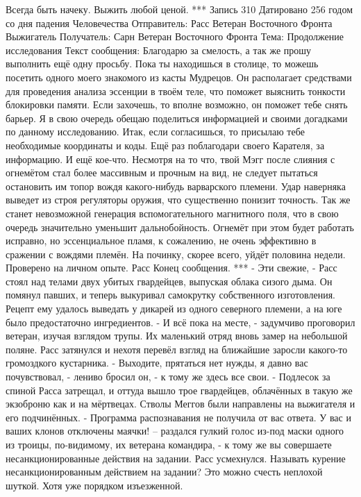 \documentclass[a4paper, 12pt]{report}
\begin{document}
Всегда быть начеку. Выжить любой ценой.
***
Запись 310
Датировано 256 годом со дня падения Человечества
Отправитель: Расс Ветеран Восточного Фронта Выжигатель
Получатель: Сарн Ветеран Восточного Фронта
Тема: Продолжение исследования
Текст сообщения:	
	Благодарю за смелость, а так же прошу выполнить ещё одну просьбу. Пока ты находишься в столице, то можешь посетить одного моего знакомого из касты Мудрецов. Он располагает средствами для проведения анализа эссенции в твоём теле, что поможет выяснить тонкости блокировки памяти. Если захочешь, то вполне возможно, он поможет тебе снять барьер. Я в свою очередь обещаю поделиться информацией и своими догадками по данному исследованию. 
Итак, если согласишься, то присылаю тебе необходимые координаты и коды.
Ещё раз поблагодари своего Карателя, за информацию.
	И ещё кое-что. Несмотря на то что, твой Мэгг после слияния с огнемётом стал более массивным и прочным на вид, не следует пытаться остановить им топор вождя какого-нибудь варварского племени. Удар наверняка выведет из строя регуляторы оружия, что существенно понизит точность. Так же станет невозможной генерация вспомогательного магнитного поля, что в свою очередь значительно уменьшит дальнобойность. Огнемёт при этом будет работать исправно, но эссенциальное пламя, к сожалению, не очень эффективно в сражении с вождями племён. На починку, скорее всего, уйдёт половина недели. 
Проверено на личном опыте.
Расс
Конец сообщения. 
***
	- Эти свежие, - Расс стоял над телами двух убитых гвардейцев, выпуская облака сизого дыма. Он помянул павших, и теперь выкуривал самокрутку собственного изготовления. Рецепт ему удалось выведать у дикарей из одного северного племени, а на юге было предостаточно ингредиентов.
	- И всё пока на месте, - задумчиво проговорил ветеран, изучая взглядом трупы. 
Их маленький отряд вновь замер на небольшой поляне. Расс затянулся и нехотя перевёл взгляд на ближайшие заросли какого-то громоздкого кустарника.
	- Выходите, прятаться нет нужды, я давно вас почувствовал, - лениво бросил он, - к тому же здесь все свои. - 
	Подлесок за спиной Расса затрещал, и оттуда вышло трое гвардейцев, облачённых в такую же экзоброню как и на мёртвецах. Стволы Меггов были направлены на выжигателя и его подчинённых.
	- Программа распознавания не получила от вас ответа. У вас и ваших клонов отключены маячки! – раздался гулкий голос из-под маски одного из троицы, по-видимому, их ветерана командира, - к тому же вы совершаете несанкционированные действия на задании.
	Расс усмехнулся. Называть курение несанкционированным действием на задании? Это можно счесть неплохой шуткой. Хотя уже порядком изъезженной.
\end{document}
